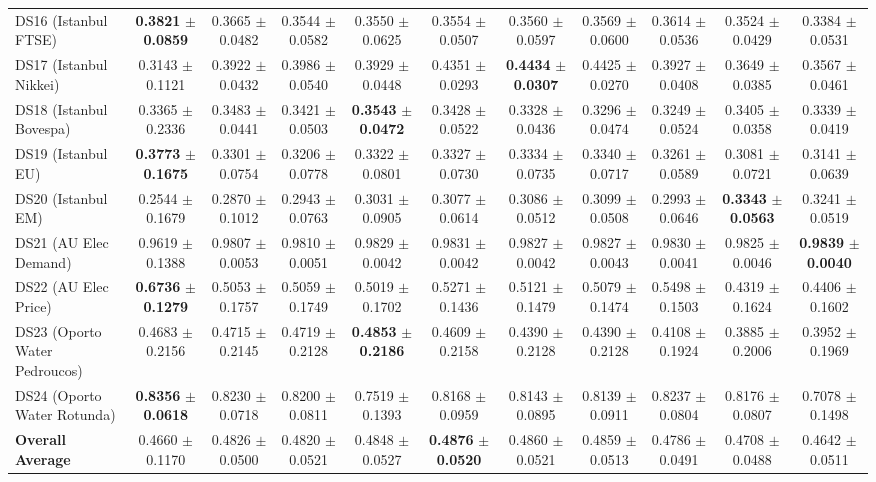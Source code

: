 \begin{table}[t]
{{\begin{tabular}{lcccccccccc}
DS16 (Istanbul FTSE) & \textbf{0.3821} $\pm$ \textbf{0.0859} & 0.3665 $\pm$ 0.0482 & 0.3544 $\pm$ 0.0582 & 0.3550 $\pm$ 0.0625 & 0.3554 $\pm$ 0.0507 & 0.3560 $\pm$ 0.0597 & 0.3569 $\pm$ 0.0600 & 0.3614 $\pm$ 0.0536 & 0.3524 $\pm$ 0.0429 & 0.3384 $\pm$ 0.0531 \\
DS17 (Istanbul Nikkei) & 0.3143 $\pm$ 0.1121 & 0.3922 $\pm$ 0.0432 & 0.3986 $\pm$ 0.0540 & 0.3929 $\pm$ 0.0448 & 0.4351 $\pm$ 0.0293 & \textbf{0.4434} $\pm$ \textbf{0.0307} & 0.4425 $\pm$ 0.0270 & 0.3927 $\pm$ 0.0408 & 0.3649 $\pm$ 0.0385 & 0.3567 $\pm$ 0.0461 \\
DS18 (Istanbul Bovespa) & 0.3365 $\pm$ 0.2336 & 0.3483 $\pm$ 0.0441 & 0.3421 $\pm$ 0.0503 & \textbf{0.3543} $\pm$ \textbf{0.0472} & 0.3428 $\pm$ 0.0522 & 0.3328 $\pm$ 0.0436 & 0.3296 $\pm$ 0.0474 & 0.3249 $\pm$ 0.0524 & 0.3405 $\pm$ 0.0358 & 0.3339 $\pm$ 0.0419 \\
DS19 (Istanbul EU) & \textbf{0.3773} $\pm$ \textbf{0.1675} & 0.3301 $\pm$ 0.0754 & 0.3206 $\pm$ 0.0778 & 0.3322 $\pm$ 0.0801 & 0.3327 $\pm$ 0.0730 & 0.3334 $\pm$ 0.0735 & 0.3340 $\pm$ 0.0717 & 0.3261 $\pm$ 0.0589 & 0.3081 $\pm$ 0.0721 & 0.3141 $\pm$ 0.0639 \\
DS20 (Istanbul EM) & 0.2544 $\pm$ 0.1679 & 0.2870 $\pm$ 0.1012 & 0.2943 $\pm$ 0.0763 & 0.3031 $\pm$ 0.0905 & 0.3077 $\pm$ 0.0614 & 0.3086 $\pm$ 0.0512 & 0.3099 $\pm$ 0.0508 & 0.2993 $\pm$ 0.0646 & \textbf{0.3343} $\pm$ \textbf{0.0563} & 0.3241 $\pm$ 0.0519 \\
DS21 (AU Elec Demand) & 0.9619 $\pm$ 0.1388 & 0.9807 $\pm$ 0.0053 & 0.9810 $\pm$ 0.0051 & 0.9829 $\pm$ 0.0042 & 0.9831 $\pm$ 0.0042 & 0.9827 $\pm$ 0.0042 & 0.9827 $\pm$ 0.0043 & 0.9830 $\pm$ 0.0041 & 0.9825 $\pm$ 0.0046 & \textbf{0.9839} $\pm$ \textbf{0.0040} \\
DS22 (AU Elec Price) & \textbf{0.6736} $\pm$ \textbf{0.1279} & 0.5053 $\pm$ 0.1757 & 0.5059 $\pm$ 0.1749 & 0.5019 $\pm$ 0.1702 & 0.5271 $\pm$ 0.1436 & 0.5121 $\pm$ 0.1479 & 0.5079 $\pm$ 0.1474 & 0.5498 $\pm$ 0.1503 & 0.4319 $\pm$ 0.1624 & 0.4406 $\pm$ 0.1602 \\
DS23 (Oporto Water Pedroucos) & 0.4683 $\pm$ 0.2156 & 0.4715 $\pm$ 0.2145 & 0.4719 $\pm$ 0.2128 & \textbf{0.4853} $\pm$ \textbf{0.2186} & 0.4609 $\pm$ 0.2158 & 0.4390 $\pm$ 0.2128 & 0.4390 $\pm$ 0.2128 & 0.4108 $\pm$ 0.1924 & 0.3885 $\pm$ 0.2006 & 0.3952 $\pm$ 0.1969 \\
DS24 (Oporto Water Rotunda) & \textbf{0.8356} $\pm$ \textbf{0.0618} & 0.8230 $\pm$ 0.0718 & 0.8200 $\pm$ 0.0811 & 0.7519 $\pm$ 0.1393 & 0.8168 $\pm$ 0.0959 & 0.8143 $\pm$ 0.0895 & 0.8139 $\pm$ 0.0911 & 0.8237 $\pm$ 0.0804 & 0.8176 $\pm$ 0.0807 & 0.7078 $\pm$ 0.1498 \\
\midrule
\textbf{Overall Average} & 0.4660 $\pm$ 0.1170 & 0.4826 $\pm$ 0.0500 & 0.4820 $\pm$ 0.0521 & 0.4848 $\pm$ 0.0527 & \textbf{0.4876} $\pm$ \textbf{0.0520} & 0.4860 $\pm$ 0.0521 & 0.4859 $\pm$ 0.0513 & 0.4786 $\pm$ 0.0491 & 0.4708 $\pm$ 0.0488 & 0.4642 $\pm$ 0.0511 \\
\bottomrule
\end{tabular}%
}%
}
\end{table}
